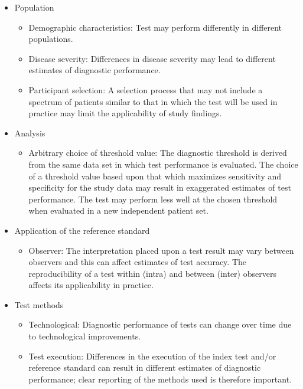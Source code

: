 \documentclass[
  11pt,
  a4paper,
  DIV=11,
  numbers=noendperiod]{scrreprt}
\providecommand{\tightlist}{%
  \setlength{\itemsep}{0pt}\setlength{\parskip}{0pt}}
\begin{document}
\begin{itemize}
\item
  Population

  \begin{itemize}
  \item
    Demographic characteristics: Test may perform differently in
    different populations.
  \item
    Disease severity: Differences in disease severity may lead to
    different estimates of diagnostic performance.
  \item
    Participant selection: A selection process that may not include a
    spectrum of patients similar to that in which the test will be used
    in practice may limit the applicability of study findings.
  \end{itemize}
\item
  Analysis

  \begin{itemize}
  \tightlist
  \item
    Arbitrary choice of threshold value: The diagnostic threshold is
    derived from the same data set in which test performance is
    evaluated. The choice of a threshold value based upon that which
    maximizes sensitivity and specificity for the study data may result
    in exaggerated estimates of test performance. The test may perform
    less well at the chosen threshold when evaluated in a new
    independent patient set.
  \end{itemize}
\item
  Application of the reference standard

  \begin{itemize}
  \tightlist
  \item
    Observer: The interpretation placed upon a test result may vary
    between observers and this can affect estimates of test accuracy.
    The reproducibility of a test within (intra) and between (inter)
    observers affects its applicability in practice.
  \end{itemize}
\item
  Test methods

  \begin{itemize}
  \item
    Technological: Diagnostic performance of tests can change over time
    due to technological improvements.
  \item
    Test execution: Differences in the execution of the index test
    and/or reference standard can result in different estimates of
    diagnostic performance; clear reporting of the methods used is
    therefore important.
  \end{itemize}
\end{itemize}
\end{document}
